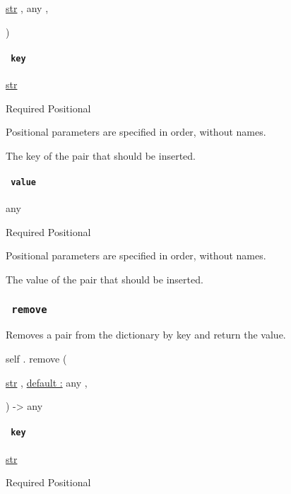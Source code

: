 { \href{/docs/reference/foundations/str/}{str} , } { { any } , }

)

\paragraph{\texorpdfstring{\texttt{\ key\ }}{ key }}\label{definitions-insert-key}

\href{/docs/reference/foundations/str/}{str}

{Required} {{ Positional }}

\label{definitions-insert-key-positional-tooltip}
Positional parameters are specified in order, without names.

The key of the pair that should be inserted.

\paragraph{\texorpdfstring{\texttt{\ value\ }}{ value }}\label{definitions-insert-value}

{ any }

{Required} {{ Positional }}

\label{definitions-insert-value-positional-tooltip}
Positional parameters are specified in order, without names.

The value of the pair that should be inserted.

\subsubsection{\texorpdfstring{\texttt{\ remove\ }}{ remove }}\label{definitions-remove}

Removes a pair from the dictionary by key and return the value.

self { . } { remove } (

{ \href{/docs/reference/foundations/str/}{str} , } {
\hyperref[definitions-remove-parameters-default]{default :} { any } , }

) -\textgreater{} { any }

\paragraph{\texorpdfstring{\texttt{\ key\ }}{ key }}\label{definitions-remove-key}

\href{/docs/reference/foundations/str/}{str}

{Required} {{ Positional }}

